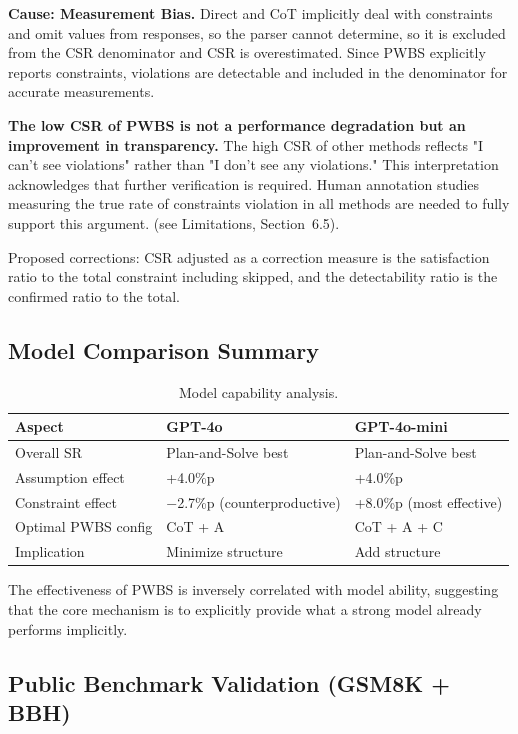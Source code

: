 \documentclass[11pt,a4paper]{article}
\begin{document}
\textbf{Cause: Measurement Bias.} Direct and CoT implicitly deal with constraints and omit values from responses, so the parser cannot determine, so it is excluded from the CSR denominator and CSR is overestimated. Since PWBS explicitly reports constraints, violations are detectable and included in the denominator for accurate measurements.

\textbf{The low CSR of PWBS is not a performance degradation but an improvement in transparency.} The high CSR of other methods reflects "I can't see violations" rather than "I don't see any violations." This interpretation acknowledges that further verification is required. Human annotation studies measuring the true rate of constraints violation in all methods are needed to fully support this argument. (see Limitations, Section~6.5).

Proposed corrections: CSR adjusted as a correction measure is the satisfaction ratio to the total constraint including skipped, and the detectability ratio is the confirmed ratio to the total.

\subsection{Model Comparison Summary}

\begin{table}[h]
\centering
\caption{Model capability analysis.}
\label{tab:model-comparison}
\begin{tabular}{lll}
\toprule
\textbf{Aspect} & \textbf{GPT-4o} & \textbf{GPT-4o-mini} \\
\midrule
Overall SR & Plan-and-Solve best & Plan-and-Solve best \\
Assumption effect & +4.0\%p & +4.0\%p \\
Constraint effect & $-$2.7\%p (counterproductive) & +8.0\%p (most effective) \\
Optimal PWBS config & CoT + A & CoT + A + C \\
Implication & Minimize structure & Add structure \\
\bottomrule
\end{tabular}
\end{table}

The effectiveness of PWBS is inversely correlated with model ability, suggesting that the core mechanism is to explicitly provide what a strong model already performs implicitly.

\subsection{Public Benchmark Validation (GSM8K + BBH)}
\end{document}
